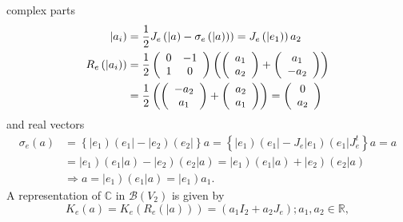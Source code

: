 \documentclass[aps,preprint]{revtex4}%
\begin{document}
complex parts%
\begin{align}
\left\vert a_{i}\right)   &  =\frac{1}{2}J_{e}\left(  \left\vert a\right)
-\sigma_{e}\left(  \left\vert a\right)  \right)  \right)  =J_{e}\left(
\left\vert e_{1}\right)  \right)  a_{2}\\
R_{e}\left(  \left\vert a_{i}\right)  \right)   &  =\frac{1}{2}\left(
\begin{array}
[c]{cc}%
0 & -1\\
1 & 0
\end{array}
\right)  \left(  \left(
\begin{array}
[c]{c}%
a_{1}\\
a_{2}%
\end{array}
\right)  +\left(
\begin{array}
[c]{c}%
a_{1}\\
-a_{2}%
\end{array}
\right)  \right) \\
&  =\frac{1}{2}\left(  \left(
\begin{array}
[c]{c}%
-a_{2}\\
a_{1}%
\end{array}
\right)  +\left(
\begin{array}
[c]{c}%
a_{2}\\
a_{1}%
\end{array}
\right)  \right)  =\left(
\begin{array}
[c]{c}%
0\\
a_{2}%
\end{array}
\right)
\end{align}
and real vectors
\begin{align}
\sigma_{e}\left(  a\right)   &  =\left\{  \left\vert e_{1}\right)  \left(
e_{1}\right\vert -\left\vert e_{2}\right)  \left(  e_{2}\right\vert \right\}
a=\left\{  \left\vert e_{1}\right)  \left(  e_{1}\right\vert -J_{e}\left\vert
e_{1}\right)  \left(  e_{1}\right\vert J_{e}^{t}\right\}  a=a\\
&  =\left\vert e_{1}\right)  \left(  \left.  e_{1}\right\vert a\right)
-\left\vert e_{2}\right)  \left(  \left.  e_{2}\right\vert a\right)
=\left\vert e_{1}\right)  \left(  \left.  e_{1}\right\vert a\right)
+\left\vert e_{2}\right)  \left(  \left.  e_{2}\right\vert a\right) \\
&  \Rightarrow a=\left\vert e_{1}\right)  \left(  \left.  e_{1}\right\vert
a\right)  =\left\vert e_{1}\right)  a_{1}.
\end{align}
A representation of $\mathbb{C}$ in $\mathcal{B}\left(  V_{2}\right)  $ is
given by
\begin{equation}
K_{e}\left(  a\right)  =K_{e}\left(  R_{e}\left(  \left\vert a\right)
\right)  \right)  =\left(  a_{1}I_{2}+a_{2}J_{e}\right)  ;a_{1},a_{2}%
\in\mathbb{R},
\end{equation}
\end{document}
